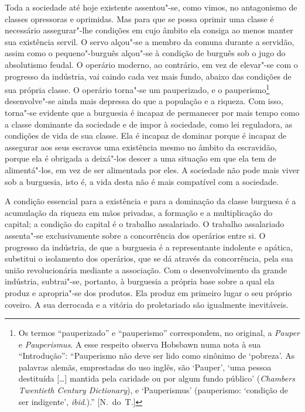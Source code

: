 Toda a sociedade até hoje existente assentou"-se, como vimos,
no antagonismo de classes opressoras e oprimidas. Mas para que se possa
oprimir uma classe é necessário assegurar"-lhe condições em cujo
âmbito ela consiga ao menos manter sua existência servil. O servo
alçou"-se a membro da comuna durante a servidão, assim como o
pequeno"-burguês alçou"-se à condição de burguês sob o jugo do
absolutismo feudal. O operário moderno, ao contrário, em vez de
elevar"-se com o progresso da indústria, vai caindo cada vez mais
fundo, abaixo das condições de sua própria classe. O operário
torna"-se um pauperizado, e o
pauperismo\footnote{ Os termos ``pauperizado'' e ``pauperismo'' correspondem, 
no original, a \textit{Pauper} e \textit{Pauperismus}. A esse respeito observa 
Hobsbawn numa nota à sua ``Introdução'': ``Pauperismo não deve ser lido
como sinônimo de ‘pobreza’. As palavras alemãs, emprestadas do uso
inglês, são ‘Pauper’, ‘uma pessoa destituída [\ldots] mantida pela
caridade ou por algum fundo público’ (\textit{Chambers Twentieth
Century Dictionary}), e ‘Pauperismus’ (pauperismo: ‘condição de ser
indigente’, \textit{ibid}.).'' [N.~do~T.]}
desenvolve"-se ainda mais depressa do que a população e a
riqueza. Com isso, torna"-se evidente que a burguesia é incapaz de
permanecer por mais tempo como a classe dominante da sociedade e de
impor à sociedade, como lei reguladora, as condições de vida de sua
classe. Ela é incapaz de dominar porque é incapaz de assegurar aos seus
escravos uma existência mesmo no âmbito da escravidão, porque ela é
obrigada a deixá"-los descer a uma situação em que ela tem de
alimentá"-los, em vez de ser alimentada por eles. A sociedade não pode
mais viver sob a burguesia, isto é, a vida desta não é mais compatível
com a sociedade.

A condição essencial para a existência e para a dominação da classe
burguesa é a acumulação da riqueza em mãos privadas, a formação e a
multiplicação do capital; a condição do capital é o trabalho
assalariado. O trabalho assalariado assenta"-se exclusivamente sobre a
concorrência dos operários entre si. O progresso da indústria, de que a
burguesia é a representante indolente e apática, substitui o isolamento
dos operários, que se dá através da concorrência, pela sua união
revolucionária mediante a associação. Com o desenvolvimento da grande
indústria, subtrai"-se, portanto, à burguesia a própria base sobre a
qual ela produz e apropria"-se dos produtos. Ela produz em primeiro
lugar o seu próprio coveiro. A sua derrocada e a vitória do
proletariado são igualmente inevitáveis.

